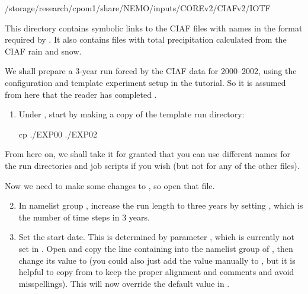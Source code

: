 \begin{VerbatimFile}
/storage/research/cpom1/share/NEMO/inputs/COREv2/CIAFv2/IOTF
\end{VerbatimFile}

This directory contains symbolic links to the CIAF files with names in the format required by \NEMOSIcu{}.
It also contains files  with total precipitation calculated from the CIAF rain and snow.

We shall prepare a 3-year run forced by the CIAF data for \mbox{2000--2002}, using the configuration and template experiment setup in the tutorial.
So it is assumed from here that the reader has completed .

\begin{enumerate}

    \item Under , start by making a copy of the template run directory:

\begin{VerbatimCMD}
cp  ./EXP00 ./EXP02
\end{VerbatimCMD}

\end{enumerate}

From here on, we shall take it for granted that you can use different names for the run directories and job scripts if you wish (but not for any of the other files).

Now we need to make some changes to , so open that file.

\begin{enumerate}\setcounter{enumi}{1}
    \item In namelist group , increase the run length to three years by setting , which is the number of time steps in 3 years.
    
    \item Set the start date. This is determined by parameter , which is currently not set in .
    Open  and copy the line containing  into the  namelist group of , then change its value to  (you could also just add the value manually to , but it is helpful to copy from  to keep the proper alignment and comments and avoid misspellings).
    This will now override the default value  in .
\end{enumerate}

